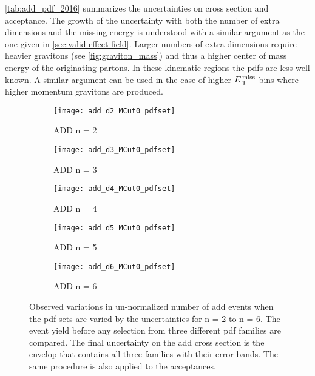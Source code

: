 \cref{tab:add_pdf_2016} summarizes the uncertainties on cross section and
acceptance. The growth of the uncertainty with both the number of extra
dimensions and the missing energy is understood with a similar argument as the
one given in \cref{sec:valid-effect-field}. Larger numbers of extra dimensions
require heavier gravitons (see \cref{fig:graviton_mass}) and thus a higher
center of mass energy of the originating partons. In these kinematic regions the
\glspl{pdf} are less well known. A similar argument can be used in the case of
higher $E_\mathrm{\, T}^\mathrm{\, miss}$ bins where higher momentum gravitons are produced.
\begin{figure}[!htb]
  \centering
  \begin{subfigure}{.48\linewidth}
    \texttt{[image: add\_d2\_MCut0\_pdfset]}
    \caption{ADD n = 2}
    \label{fig:pdf_n2}
  \end{subfigure}
  \begin{subfigure}{.48\linewidth}
    \texttt{[image: add\_d3\_MCut0\_pdfset]}
    \caption{ADD n = 3}
    \label{fig:pdf_n3}
  \end{subfigure}
  \begin{subfigure}{.48\linewidth}
    \texttt{[image: add\_d4\_MCut0\_pdfset]}
    \caption{ADD n = 4}
    \label{fig:pdf_n4}
  \end{subfigure}
  \begin{subfigure}{.48\linewidth}
    \texttt{[image: add\_d5\_MCut0\_pdfset]}
    \caption{ADD n = 5}
    \label{fig:pdf_n5}
  \end{subfigure}
  \begin{subfigure}{.48\linewidth}
    \texttt{[image: add\_d6\_MCut0\_pdfset]}
    \caption{ADD n = 6}
    \label{fig:pdf_n6}
  \end{subfigure}
  \caption{Observed variations in un-normalized number of \gls{add} events when
    the \gls{pdf} sets are varied by the uncertainties for n = 2 to n = 6. The
    event yield before any selection from three different \gls{pdf} families are
    compared. The final uncertainty on the \gls{add} cross section is the
    envelop that contains all three families with their error bands. The same
    procedure is also applied to the acceptances.}
  \label{fig:pdf_syst}
\end{figure}

